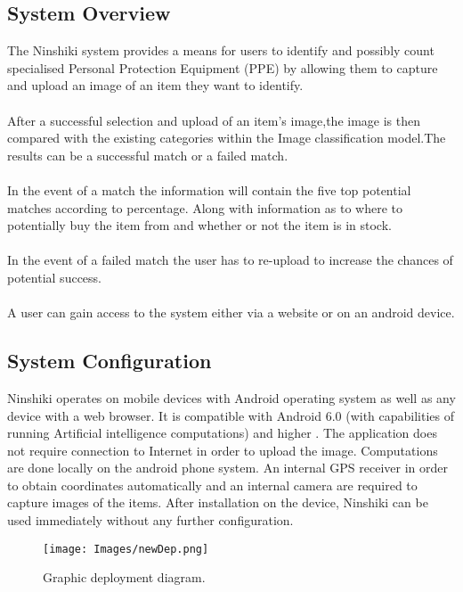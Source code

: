 \documentclass[a4paper, 12pt]{article}
\begin{document}
\subsection{System Overview}
The Ninshiki system provides a means for users to identify and possibly count specialised Personal Protection Equipment (PPE) by allowing them to capture and upload an image of an item they want to identify.
\\ \\
After a successful selection and upload of an item's image,the image is then compared with the existing categories within the Image classification model.The results can be a successful match or a failed match.
\\ \\
In the event of a match the information will contain the five top potential matches according to percentage. Along with information as to where to potentially buy the item from and whether or not the item is in stock.
\\ \\
In the event of a failed match the user has to re-upload to increase the chances of potential success.
\\ \\
A user can gain access to the system either via a website or on an android device.

\subsection{System Configuration}
Ninshiki operates on mobile devices with Android operating system as well as any device with a web browser. It is compatible with Android 6.0 (with capabilities of running Artificial intelligence computations) and higher . The application does not require connection to Internet in order to upload the image. Computations are done locally on the android phone system. An internal GPS receiver in order to obtain coordinates automatically and an internal camera are required to capture images of the items. After installation on the device, Ninshiki can be used immediately without any further configuration. 
\pagebreak
\begin{figure}[h!]
\texttt{[image: Images/newDep.png]}
\centering
\caption{Graphic deployment diagram.}
\end{figure}
\end{document}
